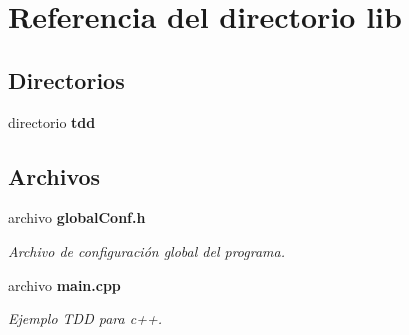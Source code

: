 \section{Referencia del directorio lib}
\label{dir_97aefd0d527b934f1d99a682da8fe6a9}
\subsection*{Directorios}
\begin{DoxyCompactItemize}
\item 
directorio {\bf tdd}
\end{DoxyCompactItemize}
\subsection*{Archivos}
\begin{DoxyCompactItemize}
\item 
archivo {\bf global\+Conf.\+h}
\begin{DoxyCompactList}\small\item\em Archivo de configuración global del programa. \end{DoxyCompactList}\item 
archivo {\bf main.\+cpp}
\begin{DoxyCompactList}\small\item\em Ejemplo T\+D\+D para c++. \end{DoxyCompactList}\end{DoxyCompactItemize}
